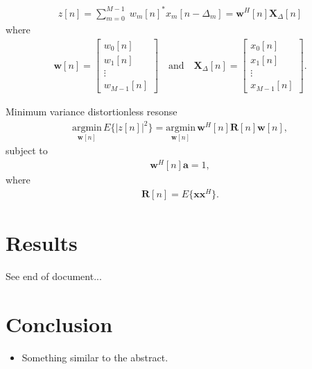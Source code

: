 \documentclass[10pt,journal,draftclsnofoot,onecolumn]{IEEEtran}
\let\MYoriglatexcaption\caption               %
\renewcommand{\caption}[2][\relax]{\MYoriglatexcaption[#2]{#2}}
\newcommand\bmat[1]{\begin{bmatrix}#1\end{bmatrix}}
\newcommand\argmin[1]{\text{arg}\;\underset{#1}{\text{min}}}
\newcommand\sumb[2]{\sum\limits_{#1}^{#2}\;}
\renewcommand\H{^{\scriptscriptstyle H}}
\renewcommand\vec[1]{\boldsymbol{#1}}
\newcommand\mat[1]{\boldsymbol{#1}}
\newcommand\1{\vec 1}
\renewcommand*\a{\vec a}
\newcommand*\w{\vec w}
\newcommand*\x{\vec x}
\newcommand*\R{\mat R}
\newcommand*\X{\mat X}
\newcommand*\Xd{\X_{\!\Delta}}
\renewcommand\argmin{\text{argmin}}
\begin{document}
\begin{align}
z[n] = \sumb{m=0}{M-1} w_m[n]^*x_m[n-\Delta_m] = \w\H[n]\Xd[n]
\end{align}
where
\begin{align}
\w[n] = \bmat{w_0[n]\\w_1[n]\\\vdots\\w_{M-1}[n]} \quad \text{and} \quad\Xd[n] = \bmat{x_0[n]\\x_1[n]\\\vdots\\x_{M-1}[n]}.
\end{align}

Minimum variance distortionless resonse \cite{Capon1969}
\begin{align}
\underset{\w[n]}{\argmin}\, E\{ |z[n]|^2 \} = \underset{\w[n]}{\argmin}\, \w\H[n]\R[n]\w[n], 
\end{align}
subject to
\begin{align}
\w\H[n]\a = 1,
\end{align}
where
\begin{align}
\R[n] = E\{ \x\x\H \}.
\end{align}


\section{Results}


See end of document...



\section{Conclusion}

\begin{itemize}
\item Something similar to the abstract.
\end{itemize}
\end{document}
